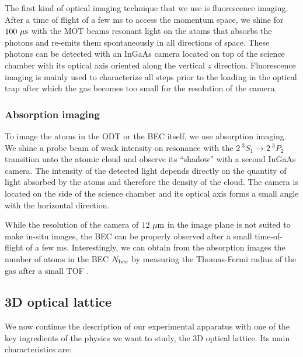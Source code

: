 The first kind of optical imaging technique that we use is fluorescence imaging. After a time of flight of a few ms to access the momentum space, we shine for $100 \ \mu \rm{s}$ with the MOT beams resonant light on the atoms that absorbs the photons and re-emits them spontaneously in all directions of space. These photons can be detected with an InGaAs camera located on top of the science chamber with its optical axis oriented along the vertical $z$ direction. Fluorescence imaging is mainly used to characterize all steps prior to the loading in the optical trap after which the gas becomes too small for the resolution of the camera.
 
\subsubsection{Absorption imaging}

To image the atoms in the ODT or the BEC itself, we use absorption imaging. We shine a probe beam of weak intensity on resonance with the $2 \ ^3 S_1 \rightarrow 2 \ ^3 P_2$ transition unto the atomic cloud and observe its ``shadow'' with a second InGaAs camera. The intensity of the detected light depends directly on the quantity of light absorbed by the atoms and therefore the density of the cloud. The camera is located on the side of the science chamber and its optical axis forms a small angle with the horizontal direction.

While the resolution of the camera of $12 \ \mu \rm{m}$ in the image plane is not suited to make in-situ images, the BEC can be properly observed after a small time-of-flight of a few ms. Interestingly, we can obtain from the absorption images the number of atoms in the BEC $N_{\rm{bec}}$ by measuring the Thomas-Fermi radius of the gas after a small TOF \cite{bouton_these}.



\subsection{3D optical lattice}

We now continue the description of our experimental apparatus with one of the key ingredients of the physics we want to study, the 3D optical lattice. Its main characteristics are: 

